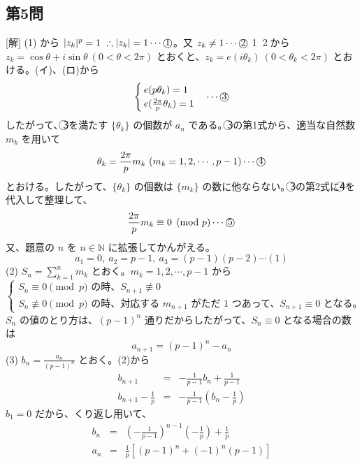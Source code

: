 \documentclass[../main.tex]{subfiles}
\begin{document}
\subsection*{第5問}
[解] (1) から $|z_k|^p = 1 \ \therefore |z_k| = 1 \cdots \text{\textcircled{1}}$。又 $z_k \neq 1 \cdots \text{\textcircled{2}}$
\textcircled{1}、\textcircled{2}から $z_k = \cos\theta + i\sin\theta\ (0 < \theta < 2\pi)$ とおくと、$z_k = e(i\theta_k)\ (0 < \theta_k < 2\pi)$ とおける。(イ)、(ロ)から
\begin{eqnarray*}
  \begin{cases} e(p\theta_k) = 1 \\ e(\frac{2\pi}{p}\theta_k) = 1
  \end{cases} \cdots \text{\textcircled{3}}
\end{eqnarray*}
したがって、\textcircled{3}を満たす $\{\theta_k\}$ の個数が $a_n$ である。\textcircled{3}の第1式から、適当な自然数 $m_k$ を用いて
\[ \theta_k = \frac{2\pi}{p}m_k\ (m_k = 1, 2, \cdots, p-1) \cdots \text{\textcircled{4}} \]
とおける。したがって、$\{\theta_k\}$ の個数は $\{m_k\}$ の数に他ならない。\textcircled{3}の第2式に\textcircled{4}を代入して整理して、
\[ \frac{2\pi}{p} m_k \equiv 0 \pmod p \cdots \text{\textcircled{5}} \]
又、題意の $n$ を $n \in \mathbb{N}$ に拡張してかんがえる。
\[ a_1 = 0,\ a_2 = p-1,\ a_3 = (p-1)(p-2) \cdots (1) \]
(2) $S_n = \sum_{k=1}^n m_k$ とおく。$m_k = 1, 2, \cdots, p-1$ から
\[
  \begin{cases} S_n \equiv 0 \pmod p \text{ の時、} S_{n+1} \not\equiv 0 \\ S_n \not\equiv 0 \pmod p \text{ の時、対応する } m_{n+1} \text{ がただ } 1 \text{ つあって、} S_{n+1} \equiv 0 \text{ となる。}
\end{cases} \]
$S_n$ の値のとり方は、$(p-1)^n$ 通りだからしたがって、$S_n \equiv 0$ となる場合の数は
\[ a_{n+1} = (p-1)^n - a_n \]
(3) $b_n = \frac{a_n}{(p-1)^n}$ とおく。(2)から
\begin{eqnarray*}
  b_{n+1} &=& -\frac{1}{p-1} b_n + \frac{1}{p-1} \\
  b_{n+1} - \frac{1}{p} &=& -\frac{1}{p-1} \left(b_n - \frac{1}{p}\right)
\end{eqnarray*}
$b_1=0$ だから、くり返し用いて、
\begin{eqnarray*}
  b_n &=& \left(-\frac{1}{p-1}\right)^{n-1} \left(-\frac{1}{p}\right) + \frac{1}{p} \\
  a_n &=& \frac{1}{p} \left[ (p-1)^n + (-1)^n (p-1) \right]
\end{eqnarray*}
\end{document}
